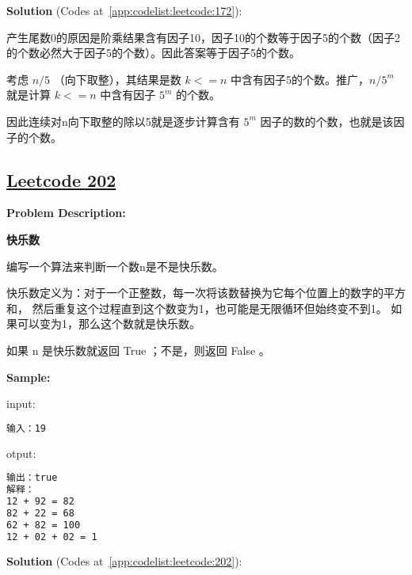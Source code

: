 \textbf{Solution }(Codes at~\ref{app:codelist:leetcode:172}):\par

产生尾数0的原因是阶乘结果含有因子10，因子10的个数等于因子5的个数（因子2的个数必然大于因子5的个数）。因此答案等于因子5的个数。\par

考虑 $n/5$ （向下取整），其结果是数 $k<=n$ 中含有因子5的个数。推广，$n/5^{m}$ 就是计算 $k<=n$ 中含有因子 $5^{m}$ 的个数。\par

因此连续对n向下取整的除以5就是逐步计算含有 $5^{m}$ 因子的数的个数，也就是该因子的个数。\par



\subsection{\href{https://leetcode-cn.com/}{Leetcode 202}}\label{app:problemlist:leetcode:202}

\textbf{Problem Description:}\par

\textbf{快乐数}\par

编写一个算法来判断一个数n是不是快乐数。\par

快乐数定义为：对于一个正整数，每一次将该数替换为它每个位置上的数字的平方和，
然后重复这个过程直到这个数变为1，也可能是无限循环但始终变不到1。
如果可以变为1，那么这个数就是快乐数。\par

如果 n 是快乐数就返回 True ；不是，则返回 False 。\par


\textbf{Sample:}\par

input:\par

\begin{lstlisting}[language=bash]
输入：19
\end{lstlisting}

otput:\par

\begin{lstlisting}[language=bash]
输出：true
解释：
12 + 92 = 82
82 + 22 = 68
62 + 82 = 100
12 + 02 + 02 = 1
\end{lstlisting}

\textbf{Solution }(Codes at~\ref{app:codelist:leetcode:202}):\par

